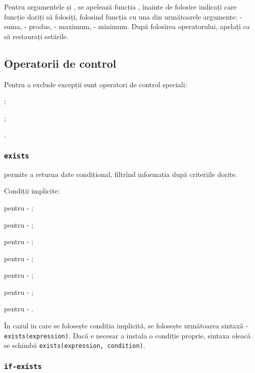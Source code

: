 Pentru argumentele \integer{} și \double{}, se apelează funcția , înainte de folosire indicați care funcție doriți să folosiți, folosind funcția  cu una din următoarele argumente:  - suma,  - produs,  - maximum,  - minimum. După folosirea operatorului, apelați  ca să restaurați setările.

\subsection{Operatorii de control}

Pentru a exclude excepții sunt operatori de control speciali:
\begin{icItems}
	\item {};
	\item {};
	\item {}.
\end{icItems}

\subsubsection{\lstinline|exists|}

 permite a returna date condițional, filtrînd informația după criteriile dorite.

Condiții implicite:
\begin{icItems}
	\item
	pentru \bool{} - ;
	\item
	pentru \integer{} - ;
	\item
	pentru \double{} - ;
	\item
	pentru \str{} - ;
	\item
	pentru \listtype{} - ;
	\item
	pentru \set{} - ;
	\item
	pentru \element{} - .
\end{icItems}

În cazul in care se folosește condiția implicită, se folosește următoarea sintaxă - \lstinline|exists(expression)|.
Dacă e necesar a instala o condiție proprie, sintaxa oleacă se schimbă \lstinline|exists(expression, condition)|.

\subsubsection{\lstinline|if-exists|}

